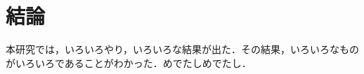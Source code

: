 \documentclass[a4paper,xelatex,ja=standard,hiresbb,12pt]{bxjsarticle}
\begin{document}
    \section{結論\label{sec:結論}}
    本研究では，いろいろやり，いろいろな結果が出た．その結果，いろいろなものがいろいろであることがわかった．めでたしめでたし．
\end{document}
